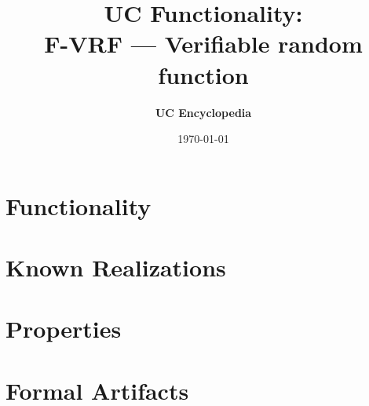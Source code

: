 \documentclass[11pt,a4paper]{article}
\title{\textbf{\Large UC Functionality:}\\[0.2em] \Large F-VRF --- Verifiable random function}
\author{\textbf{UC Encyclopedia}}
\date{\today}
\newtheorem{functionality}{Functionality}
\begin{document}
\maketitle

\begin{abstract}
\end{abstract}

\section{Functionality}

%

\section{Known Realizations}


\section{Properties}


\section{Formal Artifacts}

\end{document}
